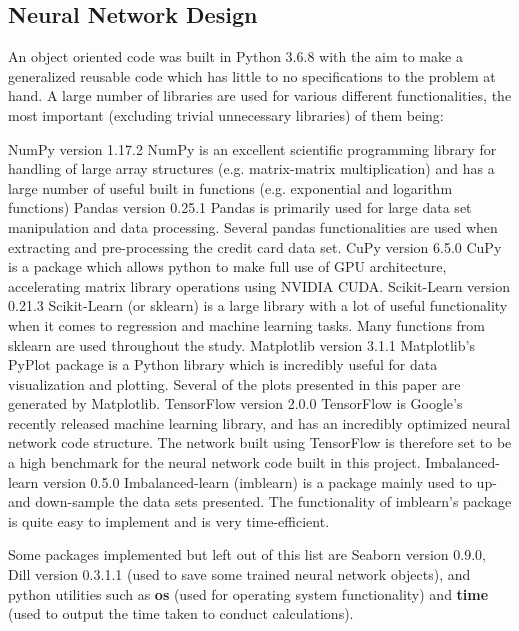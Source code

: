     \subsection{Neural Network Design}
        An object oriented code was built in Python 3.6.8 with the aim to make a generalized reusable code which has little to no specifications to the problem at hand. A large number of libraries are used for various different functionalities, the most important (excluding trivial unnecessary libraries) of them being:
        \begin{outline}[itemize]
            \1 NumPy version 1.17.2
                \2 NumPy is an excellent scientific programming library for handling of large array structures (e.g. matrix-matrix multiplication) and has a large number of useful built in functions (e.g. exponential and logarithm functions)
            \1 Pandas version 0.25.1
                \2 Pandas is primarily used for large data set manipulation and data processing. Several pandas functionalities are used when extracting and pre-processing the credit card data set.
            \1 CuPy version 6.5.0
            	\2 CuPy is a package which allows python to make full use of GPU architecture, accelerating matrix library operations using NVIDIA CUDA.
            \1 Scikit-Learn version 0.21.3
                \2 Scikit-Learn (or sklearn) is a large library with a lot of useful functionality when it comes to regression and machine learning tasks. Many functions from sklearn are used throughout the study.
            \1 Matplotlib version 3.1.1
                \2 Matplotlib's PyPlot package is a Python library which is incredibly useful for data visualization and plotting. Several of the plots presented in this paper are generated by Matplotlib.
            \1 TensorFlow version 2.0.0
                \2 TensorFlow is Google's recently released machine learning library, and has an incredibly optimized neural network code structure. The network built using TensorFlow is therefore set to be a high benchmark for the neural network code built in this project.
            \1 Imbalanced-learn version 0.5.0
                \2 Imbalanced-learn (imblearn) is a package mainly used to up- and down-sample the data sets presented. The functionality of imblearn's package is quite easy to implement and is very time-efficient.
        \end{outline}
        Some packages implemented but left out of this list are Seaborn version 0.9.0, Dill version 0.3.1.1 (used to save some trained neural network objects), and python utilities such as \textbf{os} (used for operating system functionality) and \textbf{time} (used to output the time taken to conduct calculations).
        
